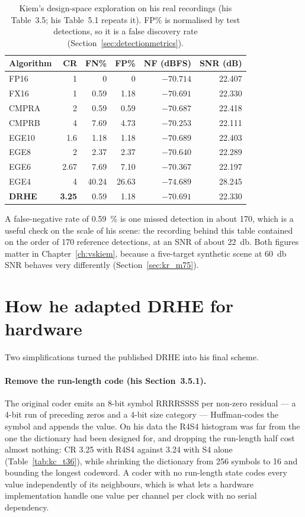 \begin{table}[htbp]
\centering
\caption[Kiem's design-space results]{Kiem's design-space exploration on his
real recordings (his Table~3.5; his Table~5.1 repeats it). FP\% is normalised
by test detections, so it is a false discovery rate
(Section~\ref{sec:detectionmetrics}).}
\label{tab:kc_t35}
\small
\begin{tabular}{@{}lrrrrr@{}}
\toprule
Algorithm & CR & FN\% & FP\% & NF (dBFS) & SNR (dB)\\
\midrule
FP16  & 1    & 0     & 0     & $-70.714$ & 22.407\\
FX16  & 1    & 0.59  & 1.18  & $-70.691$ & 22.330\\
CMPRA & 2    & 0.59  & 0.59  & $-70.687$ & 22.418\\
CMPRB & 4    & 7.69  & 4.73  & $-70.253$ & 22.111\\
EGE10 & 1.6  & 1.18  & 1.18  & $-70.689$ & 22.403\\
EGE8  & 2    & 2.37  & 2.37  & $-70.640$ & 22.289\\
EGE6  & 2.67 & 7.69  & 7.10  & $-70.367$ & 22.197\\
EGE4  & 4    & 40.24 & 26.63 & $-74.689$ & 28.245\\
\textbf{DRHE} & \textbf{3.25} & 0.59 & 1.18 & $-70.691$ & 22.330\\
\bottomrule
\end{tabular}
\end{table}

\noindent
A false-negative rate of \SI{0.59}{\percent} is one missed detection in about
170, which is a useful check on the scale of his scene: the recording behind
this table contained on the order of 170 reference detections, at an SNR of
about \SI{22}{\decibel}. Both figures matter in Chapter~\ref{ch:vskiem}, because a five-target
synthetic scene at \SI{60}{\decibel} SNR behaves very differently
(Section~\ref{sec:kr_m75}).

\section{How he adapted DRHE for hardware}
\label{sec:kc_adapt}

Two simplifications turned the published DRHE into his final scheme.

\paragraph{Remove the run-length code (his Section~3.5.1).} The original coder
emits an 8-bit symbol RRRRSSSS per non-zero residual --- a 4-bit run of
preceding zeros and a 4-bit size category --- Huffman-codes the symbol and
appends the value. On his data the R4S4 histogram was far from the one the
dictionary had been designed for, and dropping the run-length half cost almost
nothing: CR \num{3.25} with R4S4 against \num{3.24} with S4 alone
(Table~\ref{tab:kc_t36}), while shrinking the dictionary from 256 symbols to
16 and bounding the longest codeword. A coder with no run-length state codes
every value independently of its neighbours, which is what lets a hardware
implementation handle one value per channel per clock with no serial
dependency.

